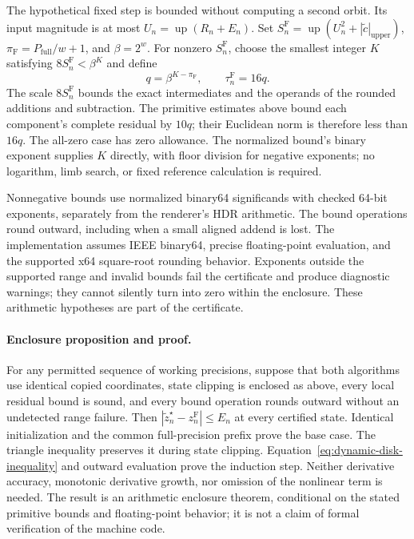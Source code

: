 The hypothetical fixed step is bounded without computing a second orbit.
Its input magnitude is at most $U_n=\operatorname{up}(R_n+E_n)$. Set
$S_n^{\mathrm F}=\operatorname{up}(U_n^2+|\widetilde c|_{\mathrm{upper}})$,
$\pi_{\mathrm F}=P_{\mathrm{full}}/w+1$, and $\beta=2^w$.
For nonzero $S_n^{\mathrm F}$, choose the smallest integer $K$ satisfying
$8S_n^{\mathrm F}<\beta^K$ and define
\[
 q=\beta^{K-\pi_{\mathrm F}},\qquad \tau_n^{\mathrm F}=16q.
\]
The scale $8S_n^{\mathrm F}$ bounds the exact intermediates and the operands
of the rounded additions and subtraction. The primitive estimates above bound
each component's complete residual by $10q$; their Euclidean norm is therefore
less than $16q$. The all-zero case has zero allowance. The normalized bound's
binary exponent supplies $K$ directly, with floor division for negative
exponents; no logarithm, limb search, or fixed reference calculation is required.

Nonnegative bounds use normalized binary64 significands with checked
64-bit exponents, separately from the renderer's HDR arithmetic. The bound
operations round outward, including when a small aligned addend is lost.
The implementation assumes IEEE binary64, precise floating-point evaluation,
and the supported x64 square-root rounding behavior. Exponents outside the
supported range and invalid bounds fail the certificate and produce diagnostic
warnings; they cannot silently turn into zero within the enclosure. These
arithmetic hypotheses are part of the certificate.

\paragraph{Enclosure proposition and proof.}
For any permitted sequence of working precisions, suppose that both algorithms
use identical copied coordinates, state clipping is enclosed as above, every
local residual bound is sound, and every bound operation rounds outward without an undetected
range failure. Then $|\widetilde z_n^\star-z_n^{\mathrm F}|\le E_n$ at every
certified state. Identical initialization and the common full-precision prefix
prove the base case. The triangle
inequality preserves it during state clipping. Equation~\eqref{eq:dynamic-disk-inequality}
and outward evaluation prove the induction step. Neither derivative accuracy,
monotonic derivative growth, nor omission of the nonlinear term is needed.
The result is an arithmetic enclosure theorem, conditional on the stated
primitive bounds and floating-point behavior; it is not a claim of formal
verification of the machine code.

